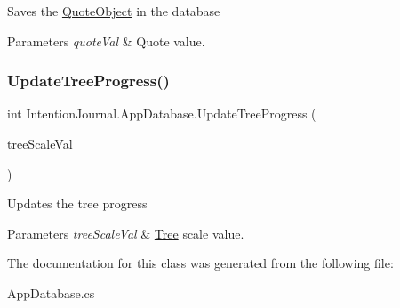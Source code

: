 Saves the \hyperlink{class_intention_journal_1_1_quote_object}{Quote\+Object} in the database 


\begin{DoxyParams}{Parameters}
{\em quote\+Val} & Quote value.\\
\hline
\end{DoxyParams}
\mbox{\label{class_intention_journal_1_1_app_database_a3b41cf46222b022becb63af220d7e1b6}} 
\subsubsection{\texorpdfstring{Update\+Tree\+Progress()}{UpdateTreeProgress()}}
{\footnotesize\ttfamily int Intention\+Journal.\+App\+Database.\+Update\+Tree\+Progress (\begin{DoxyParamCaption}\item[{\hyperlink{class_intention_journal_1_1_tree_progress}{Tree\+Progress}}]{tree\+Scale\+Val }\end{DoxyParamCaption})\hspace{0.3cm}{\ttfamily [inline]}}



Updates the tree progress 


\begin{DoxyParams}{Parameters}
{\em tree\+Scale\+Val} & \hyperlink{class_intention_journal_1_1_tree}{Tree} scale value.\\
\hline
\end{DoxyParams}


The documentation for this class was generated from the following file\+:\begin{DoxyCompactItemize}
\item 
App\+Database.\+cs\end{DoxyCompactItemize}
